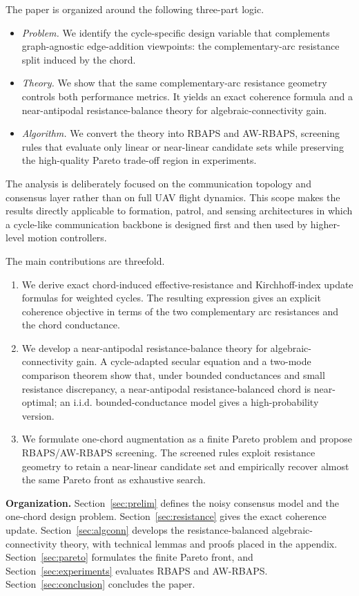 \documentclass[11pt]{article}
\numberwithin{equation}{section}
\theoremstyle{definition}
\theoremstyle{remark}
\begin{document}
The paper is organized around the following three-part logic.
\begin{itemize}[leftmargin=1.5em]
	\item \emph{Problem.} We identify the cycle-specific design variable that complements	graph-agnostic edge-addition viewpoints: the complementary-arc resistance split induced by the chord.
	\item \emph{Theory.} We show that the same complementary-arc resistance geometry controls both performance metrics. It yields an exact coherence formula and a near-antipodal resistance-balance theory for algebraic-connectivity gain.
	\item \emph{Algorithm.} We convert the theory into RBAPS and AW-RBAPS, screening rules that evaluate only linear or near-linear candidate sets while preserving the high-quality Pareto trade-off region in experiments.
\end{itemize}
The analysis is deliberately focused on the communication topology and consensus layer rather than on full UAV flight dynamics. This scope makes the results directly applicable to formation, patrol, and sensing architectures in which a cycle-like communication backbone is designed first and then used by higher-level motion controllers.

The main contributions are threefold.
\begin{enumerate}[leftmargin=1.6em]
	\item We derive exact chord-induced effective-resistance and Kirchhoff-index update formulas for weighted cycles. The resulting expression gives an explicit coherence objective in terms of the two complementary arc resistances and the chord conductance.
	\item We develop a near-antipodal resistance-balance theory for algebraic-connectivity gain. A cycle-adapted secular equation and a two-mode comparison theorem show that, under bounded conductances and small resistance discrepancy, a near-antipodal resistance-balanced chord is near-optimal; an i.i.d. bounded-conductance model gives a high-probability version.
	\item We formulate one-chord augmentation as a finite Pareto problem and propose RBAPS/AW-RBAPS screening. The screened rules exploit resistance geometry to retain a near-linear candidate set and empirically recover almost the same Pareto front as exhaustive search.
\end{enumerate}

\textbf{Organization.}
Section~\ref{sec:prelim} defines the noisy consensus model and the one-chord design problem. Section~\ref{sec:resistance} gives the exact coherence update. Section~\ref{sec:algconn} develops the resistance-balanced algebraic-connectivity theory, with technical lemmas and proofs placed in the appendix. Section~\ref{sec:pareto} formulates the finite Pareto front, and Section~\ref{sec:experiments} evaluates RBAPS and AW-RBAPS. Section~\ref{sec:conclusion} concludes the paper.
\end{document}
